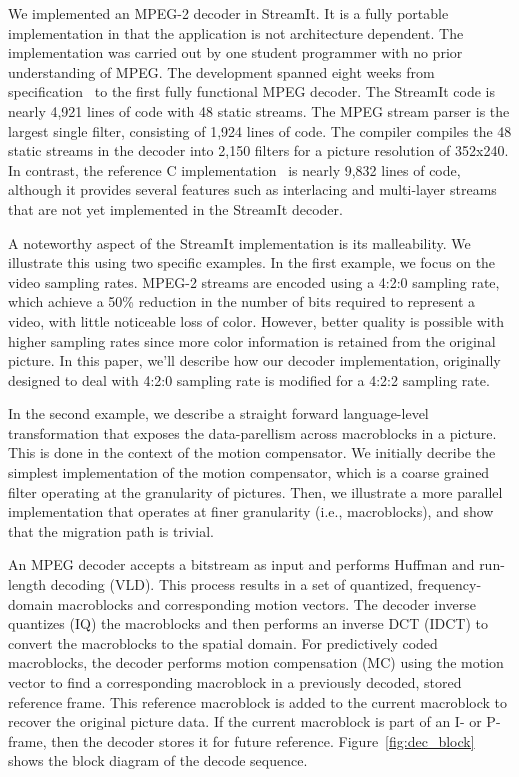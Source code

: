 
We implemented an MPEG-2 decoder in StreamIt. It is a fully portable
implementation in that the application is not architecture
dependent. The implementation was carried out by one student
programmer with no prior understanding of MPEG. The development
spanned eight weeks from specification~\cite{mpeg-spec} to the first
fully functional MPEG decoder. The StreamIt code is nearly 4,921 lines
of code with 48 static streams. The MPEG stream parser is the largest
single filter, consisting of 1,924 lines of code.  The compiler
compiles the 48 static streams in the decoder into 2,150 filters for a
picture resolution of 352x240. In contrast, the reference C
implementation~\cite{reference-mpeg-c} is nearly 9,832 lines of code,
although it provides several features such as interlacing and
multi-layer streams that are not yet implemented in the StreamIt
decoder.

A noteworthy aspect of the StreamIt implementation is its
malleability. We illustrate this using two specific examples. 
In the first example, we focus on the video sampling rates. MPEG-2
streams are encoded using a 4:2:0 sampling rate, which achieve a 50\%
reduction in the number of bits required to represent a video, with
little noticeable loss of color. However, better quality is possible
with higher sampling rates since more color information is retained
from the original picture. In this paper, we'll describe how our
decoder implementation, originally designed to deal with 4:2:0
sampling rate is modified for a 4:2:2 sampling rate.

In the second example, we describe a straight forward language-level
transformation that exposes the data-parellism across macroblocks in a
picture. This is done in the context of the motion compensator. We
initially decribe the simplest implementation of the motion
compensator, which is a coarse grained filter operating at the
granularity of pictures. Then, we illustrate a more parallel
implementation that operates at finer granularity (i.e., macroblocks),
and show that the migration path is trivial.




An MPEG decoder accepts a bitstream as input and performs Huffman and
run-length decoding (VLD).  This process results in a set of
quantized, frequency-domain macroblocks and corresponding motion
vectors.  The decoder inverse quantizes (IQ) the macroblocks and then
performs an inverse DCT (IDCT) to convert the macroblocks to the
spatial domain.  For predictively coded macroblocks, the decoder
performs motion compensation (MC) using the motion vector to find a
corresponding macroblock in a previously decoded, stored reference
frame.  This reference macroblock is added to the current macroblock
to recover the original picture data.  If the current macroblock is
part of an I- or P-frame, then the decoder stores it for future
reference.  Figure~\ref{fig:dec_block} shows the block diagram of the
decode sequence.

